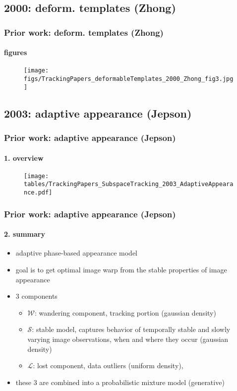 \subsection{2000: deform. templates (Zhong)}
\begin{frame}
\frametitle{Prior work: deform. templates (Zhong)}
\framesubtitle{figures}
\mypagenum
{}
	\begin{figure}
		\texttt{[image: figs/TrackingPapers\_deformableTemplates\_2000\_Zhong\_fig3.jpg]}
	\end{figure}
\end{frame}





\subsection{2003: adaptive appearance (Jepson)}
\begin{frame}
\frametitle{Prior work: adaptive appearance (Jepson)}
\framesubtitle{1. overview}
\mypagenum
{}
	\begin{figure}
		\texttt{[image: tables/TrackingPapers\_SubspaceTracking\_2003\_AdaptiveAppearance.pdf]}
	\end{figure}

\end{frame}


\begin{frame}
\frametitle{Prior work: adaptive appearance (Jepson)}
\framesubtitle{2. summary}
\mypagenum
{}
	\begin{itemize}
		\item adaptive phase-based appearance model	
		\item goal is to get optimal image warp from the stable properties of image appearance
		\item 3 components
			\begin{itemize}
				\item $\mathcal{W}$: wandering component, tracking portion (gaussian density)
				\item $\mathcal{S}$: stable model, captures behavior of temporally stable and slowly varying image observations, when and where they occur (gaussian density)
				\item $\mathcal{L}$: lost component, data outliers (uniform density), 
			\end{itemize}
		\item these 3 are combined into a probabilistic mixture model (generative)
	\end{itemize}
\end{frame}


